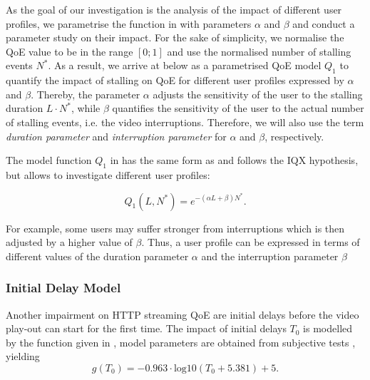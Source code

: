As the goal of our investigation is the analysis of the impact of different user profiles, we parametrise the function in  with parameters \(\alpha\) and \(\beta\) and conduct a parameter study on their impact.
For the sake of simplicity, we normalise the QoE value to be in the range \(\left[0;1\right]\)  and use the normalised number of stalling events \(N^*\).
As a result, we arrive at  below as a parametrised \gls{QoE} model \(Q_1\) to quantify the impact of stalling on QoE for different user profiles expressed by \(\alpha\) and \(\beta\).
Thereby, the parameter \(\alpha\) adjusts the sensitivity of the user to the stalling duration \(L\cdot N^*\), while \(\beta\) quantifies the sensitivity of the user to the actual number of stalling events, i.e. the video interruptions.
Therefore, we will also use the term \emph{duration parameter} and \emph{interruption parameter} for \(\alpha\) and \(\beta\), respectively.

The model function \(Q_1\) in  has the same form as  and follows the IQX hypothesis, but allows to investigate different user profiles:

\begin{equation}
   Q_1(L,N^*) = e^{-\left( \alpha L + \beta\right) N^*}.
\label{eq:application:qoe_user_behaviour:typical_user_scenarios:youtube_qoe:stalling:parameterized_model}
\end{equation}

For example, some users may suffer stronger from interruptions which is then adjusted by a higher value of \(\beta\).
Thus, a user profile can be expressed in terms of different values of the duration parameter \(\alpha\) and the interruption parameter \(\beta\)

\subsubsection*{Initial Delay  Model}\label{sec:application:qoe_user_behaviour:typical_user_scenarios:initial_delay}
Another impairment on \gls{HTTP} streaming \gls{QoE} are initial delays before the video play-out can start for the first time.
The impact of initial delays \(T_0\) is modelled by the function given in , model parameters are obtained from subjective tests \cite{Hossfeld2012c}, yielding
\begin{equation}
g(T_0)=-0.963 \cdot \mathrm{log10}(T_0 + 5.381) + 5.
\label{eq:application:qoe_user_behaviour:typical_user_scenarios:initial_delay:original_model}
\end{equation}

